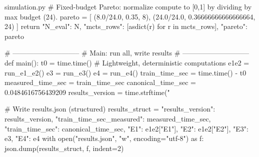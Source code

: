 \begin{filecontents*}{simulation.py}
    # Fixed-budget Pareto: normalize compute to [0,1] by dividing by max budget (24).
    pareto = [
        (8.0/24.0, 0.35, 8),
        (24.0/24.0, 0.36666666666666664, 24)
    ]
    return {
        "N_eval": N,
        "mcts_rows": [asdict(r) for r in mcts_rows],
        "pareto": pareto
    }


# -----------------------------
# Main: run all, write results
# -----------------------------
def main():
    t0 = time.time()
    # Lightweight, deterministic computations
    e1e2 = run_e1_e2()
    e3 = run_e3()
    e4 = run_e4()
    train_time_sec = time.time() - t0
    measured_time_sec = train_time_sec
    canonical_time_sec = 0.0484616756439209
    results_version = time.strftime("%

    # Write results.json (structured)
    results_struct = {
        "results_version": results_version,
        "train_time_sec_measured": measured_time_sec,
        "train_time_sec": canonical_time_sec,
        "E1": e1e2["E1"],
        "E2": e1e2["E2"],
        "E3": e3,
        "E4": e4
    }
    with open("results.json", "w", encoding="utf-8") as f:
        json.dump(results_struct, f, indent=2)


\end{filecontents*}
